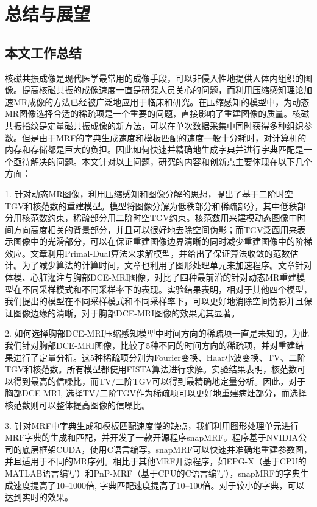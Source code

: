 \chapter{总结与展望}
\label{chap:future}

\section{本文工作总结}
核磁共振成像是现代医学最常用的成像手段，可以非侵入性地提供人体内组织的图像。提高核磁共振的成像速度一直是研究人员关心的问题，而利用压缩感知理论加速MR成像的方法已经被广泛地应用于临床和研究。在压缩感知的模型中，为动态MR图像选择合适的稀疏项是一个重要的问题，直接影响了重建图像的质量。核磁共振指纹是定量磁共振成像的新方法，可以在单次数据采集中同时获得多种组织参数。但是由于MRF的字典生成速度和模板匹配的速度一般十分耗时，对计算机的内存和存储都是巨大的负担。因此如何快速并精确地生成字典并进行字典匹配是一个亟待解决的问题。本文针对以上问题，研究的内容和创新点主要体现在以下几个方面：

1. 针对动态MR图像，利用压缩感知和图像分解的思想，提出了基于二阶时空TGV和核范数的重建模型。模型将图像分解为低秩部分和稀疏部分，其中低秩部分用核范数约束，稀疏部分用二阶时空TGV约束。核范数用来建模动态图像中时间方向高度相关的背景部分，并且可以很好地去除空间伪影；而TGV泛函用来表示图像中的光滑部分，可以在保证重建图像边界清晰的同时减少重建图像中的阶梯效应。文章利用Primal-Dual算法来求解模型，并给出了保证算法收敛的范数估计。为了减少算法的计算时间，文章也利用了图形处理单元来加速程序。文章针对体模、心脏灌注与胸部DCE-MRI图像，对比了四种最前沿的针对动态MR重建模型在不同采样模式和不同采样率下的表现。实验结果表明，相对于其他四个模型，我们提出的模型在不同采样模式和不同采样率下，可以更好地消除空间伪影并且保证图像边缘的清晰，对于胸部DCE-MRI图像的效果尤其显著。

2. 如何选择胸部DCE-MRI压缩感知模型中时间方向的稀疏项一直是未知的，为此我们针对胸部DCE-MRI图像，比较了5种不同的时间方向的稀疏项，并对重建结果进行了定量分析。这5种稀疏项分别为Fourier变换、Haar小波变换、TV、二阶TGV和核范数。所有模型都使用FISTA算法进行求解。实验结果表明，核范数可以得到最高的信噪比，而TV/二阶TGV可以得到最精确地定量分析。因此，对于胸部DCE-MRI, 选择TV/二阶TGV作为稀疏项可以更好地重建病灶部分，而选择核范数则可以整体提高图像的信噪比。

3. 针对MRF中字典生成和模板匹配速度慢的缺点，我们利用图形处理单元进行MRF字典的生成和匹配，并开发了一款开源程序snapMRF。程序基于NVIDIA公司的底层框架CUDA，使用C语言编写。snapMRF可以快速并准确地重建参数图，并且适用于不同的MR序列。相比于其他MRF开源程序，如EPG-X（基于CPU的MATLAB语言编写）和PnP-MRF（基于CPU的C语言编写），snapMRF的字典生成速度提高了10--1000倍, 字典匹配速度提高了10--100倍。对于较小的字典，可以达到实时的效果。

